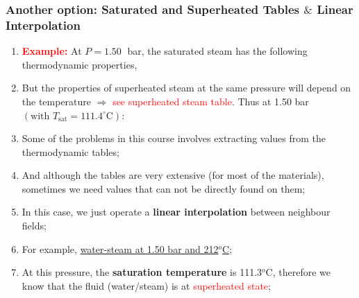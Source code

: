 \documentclass[10pt,compress]{beamer}
\begin{document}
\begin{frame}
  \frametitle{Another option: Saturated and Superheated Tables $\&$ Linear Interpolation}
\noindent
\begin{enumerate}\scriptsize
\item <1-> {\bf \textcolor{red}{Example:}} At $P=1.50\;$ bar, the saturated steam has the following thermodynamic properties,
\begin{center}
\end{center}

\item <3-> But the properties of superheated steam at the same pressure will depend on the temperature $\Rightarrow$ \textcolor{red}{see superheated steam table}. Thus at 1.50 bar $\left(\text{with }T_{\text{sat}}=111.4^{\circ}\text{C}\right)$:
\item <4-> Some of the problems in this course involves extracting values from the thermodynamic tables;
\item <5-> And although the tables are very extensive (for most of the materials), sometimes we need values that can not be directly found on them;
\item <6-> In this case, we just operate a {\bf linear interpolation} between neighbour fields;
\item <7-> For example, \underline{water-steam at 1.50 bar and 212$^{o}$C};
\item <8-> At this pressure, the {\bf saturation temperature} is 111.3$^{o}$C, therefore we know that the fluid (water/steam) is at \textcolor{red}{superheated state};

\end{enumerate}

\end{frame}
\end{document}
